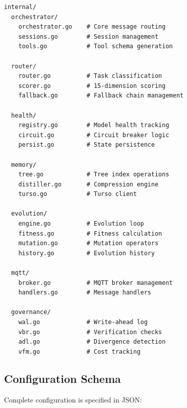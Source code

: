 \documentclass{article}
\begin{document}
\begin{lstlisting}[basicstyle=\ttfamily\footnotesize]
internal/
  orchestrator/
    orchestrator.go    # Core message routing
    sessions.go        # Session management
    tools.go           # Tool schema generation
    
  router/
    router.go          # Task classification
    scorer.go          # 15-dimension scoring
    fallback.go        # Fallback chain management
    
  health/
    registry.go        # Model health tracking
    circuit.go         # Circuit breaker logic
    persist.go         # State persistence
    
  memory/
    tree.go            # Tree index operations
    distiller.go       # Compression engine
    turso.go           # Turso client
    
  evolution/
    engine.go          # Evolution loop
    fitness.go         # Fitness calculation
    mutation.go        # Mutation operators
    history.go         # Evolution history
    
  mqtt/
    broker.go          # MQTT broker management
    handlers.go        # Message handlers
    
  governance/
    wal.go             # Write-ahead log
    vbr.go             # Verification checks
    adl.go             # Divergence detection
    vfm.go             # Cost tracking
\end{lstlisting}

\subsection{Configuration Schema}

Complete configuration is specified in JSON:
\end{document}
